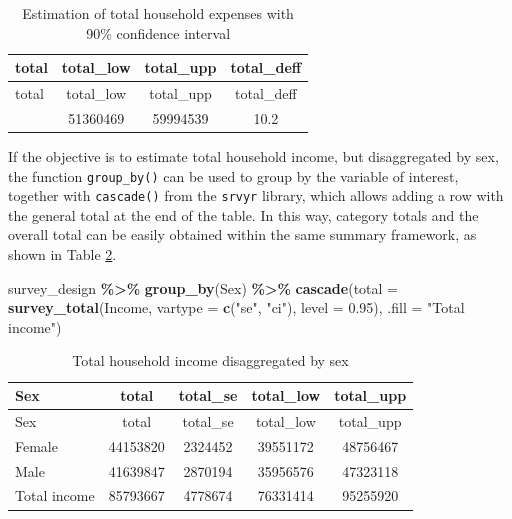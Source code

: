\documentclass[
  english,
  12pt,
]{book}
\newenvironment{Shaded}{\begin{snugshade}}{\end{snugshade}}
\newcommand{\AttributeTok}[1]{\textcolor[rgb]{0.13,0.29,0.53}{#1}}
\newcommand{\FloatTok}[1]{\textcolor[rgb]{0.00,0.00,0.81}{#1}}
\newcommand{\FunctionTok}[1]{\textcolor[rgb]{0.13,0.29,0.53}{\textbf{#1}}}
\newcommand{\NormalTok}[1]{#1}
\newcommand{\SpecialCharTok}[1]{\textcolor[rgb]{0.81,0.36,0.00}{\textbf{#1}}}
\newcommand{\StringTok}[1]{\textcolor[rgb]{0.31,0.60,0.02}{#1}}
\begin{document}
\begin{longtable}[]{@{}lccc@{}}
\caption{\label{tab:tab-total-gasto}Estimation of total household expenses with 90\% confidence interval}\tabularnewline
\toprule\noalign{}
total & total\_low & total\_upp & total\_deff \\
\midrule\noalign{}
\endfirsthead
\toprule\noalign{}
total & total\_low & total\_upp & total\_deff \\
\midrule\noalign{}
\endhead
\bottomrule\noalign{}
\endlastfoot
55677504 & 51360469 & 59994539 & 10.2 \\
\end{longtable}

If the objective is to estimate total household income, but disaggregated by sex, the function \texttt{group\_by()} can be used to group by the variable of interest, together with \texttt{cascade()} from the \texttt{srvyr} library, which allows adding a row with the general total at the end of the table. In this way, category totals and the overall total can be easily obtained within the same summary framework, as shown in Table \ref{tab:tab-total-ingreso-sexo}.

\begin{Shaded}
\begin{Highlighting}[]
\NormalTok{survey\_design }\SpecialCharTok{\%\textgreater{}\%}
  \FunctionTok{group\_by}\NormalTok{(Sex) }\SpecialCharTok{\%\textgreater{}\%}
  \FunctionTok{cascade}\NormalTok{(}\AttributeTok{total =} \FunctionTok{survey\_total}\NormalTok{(Income,}
                               \AttributeTok{vartype =} \FunctionTok{c}\NormalTok{(}\StringTok{"se"}\NormalTok{, }\StringTok{"ci"}\NormalTok{),}
                               \AttributeTok{level =} \FloatTok{0.95}\NormalTok{),}
          \AttributeTok{.fill =} \StringTok{"Total income"}\NormalTok{)}
\end{Highlighting}
\end{Shaded}

\begin{longtable}[]{@{}lcccc@{}}
\caption{\label{tab:tab-total-ingreso-sexo}Total household income disaggregated by sex}\tabularnewline
\toprule\noalign{}
Sex & total & total\_se & total\_low & total\_upp \\
\midrule\noalign{}
\endfirsthead
\toprule\noalign{}
Sex & total & total\_se & total\_low & total\_upp \\
\midrule\noalign{}
\endhead
\bottomrule\noalign{}
\endlastfoot
Female & 44153820 & 2324452 & 39551172 & 48756467 \\
Male & 41639847 & 2870194 & 35956576 & 47323118 \\
Total income & 85793667 & 4778674 & 76331414 & 95255920 \\
\end{longtable}
\end{document}
